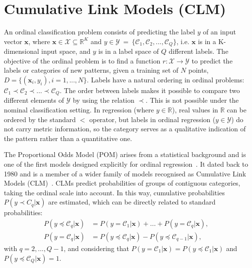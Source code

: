 \documentclass[journal]{IEEEtran}
\begin{document}
	\section{Cumulative Link Models (CLM)}
	\label{sect:ordinalproblem}
	An ordinal classification problem consists of predicting the label $y$ of an input vector $\mathbf{x}$, where $\mathbf{x} \in \mathcal{X} \subseteq \mathds{R}^K$ and $y \in \mathcal{Y}~=~\{\mathcal{C}_1, \mathcal{C}_2, ..., \mathcal{C}_Q\}$, i.e. $\mathbf{x}$ is in a K-dimensional input space, and $y$ is in a label space of $Q$ different labels. The objective of the ordinal problem is to find a function $r : \mathcal{X} \rightarrow \mathcal{Y}$ to predict the labels or categories of new patterns, given a training set of $N$ points, $D = \{(\mathbf{x}_i, y_i), i = 1, ..., N\}$. Labels have a natural ordering in ordinal problems: $\mathcal{C}_1 \prec \mathcal{C}_2 \prec ... \prec \mathcal{C}_Q$. The order between labels makes it possible to compare two different elements of $\mathcal{Y}$ by using the relation $\prec$. This is not possible under the nominal classification setting. In regression (where $y \in \mathds{R}$), real values in $\mathds{R}$ can be ordered by the standard $<$ operator, but labels in ordinal regression ($y \in \mathcal{Y}$) do not carry metric information, so the category serves as a qualitative indication of the pattern rather than a quantitative one.
	
	The Proportional Odds Model (POM) arises from a statistical background and is one of the first models designed explicitly for ordinal regression~\cite{mccullagh1980regression}. It dated back to 1980 and is a member of a wider family of models recognised as Cumulative Link Models (CLM)~\cite{agresti2010analysis}. CLMs predict probabilities of groups of contiguous categories, taking the ordinal scale into account. In this way, cumulative probabilities $P(y \prec C_q |\mathbf{x})$ are estimated, which can be directly related to standard probabilities:
	\begin{align}
		P(y \preceq \mathcal{C}_q | \mathbf{x}) &= P(y = \mathcal{C}_1 | \mathbf{x}) + ... + P(y = \mathcal{C}_q | \mathbf{x}),\\
		P(y = \mathcal{C}_q | \mathbf{x}) &= P(y \preceq \mathcal{C}_q | \mathbf{x}) - P(y \preceq \mathcal{C}_{q-1} | \mathbf{x}),
	\end{align}
	with $q = 2, ..., Q-1$, and considering that $P(y = \mathcal{C}_1 | \mathbf{x}) = P(y \preceq \mathcal{C}_1 | \mathbf{x})$ and $P(y \preceq \mathcal{C}_Q | \mathbf{x}) = 1$.
	
\end{document}
